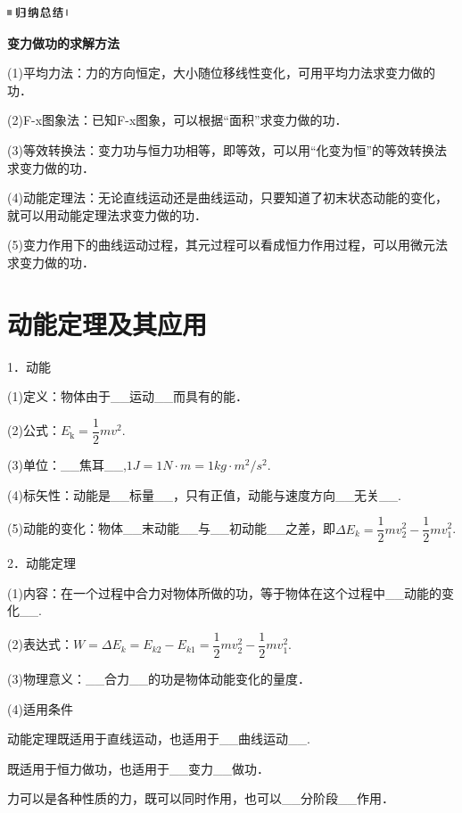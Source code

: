 \documentclass[cn,10.5pt,chinese,mac,chinesefont=founder]{elegantbook}
\begin{document}
\begin{center}\includegraphics[width=0.70833in,height=0.125in]{media/image13.png}

\textbf{变力做功的求解方法}
\end{center}


(1)平均力法：力的方向恒定，大小随位移线性变化，可用平均力法求变力做的功．

(2)F-x图象法：已知F-x图象，可以根据``面积''求变力做的功．

(3)等效转换法：变力功与恒力功相等，即等效，可以用``化变为恒''的等效转换法求变力做的功．

(4)动能定理法：无论直线运动还是曲线运动，只要知道了初末状态动能的变化，就可以用动能定理法求变力做的功．

(5)变力作用下的曲线运动过程，其元过程可以看成恒力作用过程，可以用微元法求变力做的功．

\newpage
\section{动能定理及其应用}


1．动能

(1)定义：物体由于\_\_运动\_\_而具有的能．

(2)公式：$E_{\mathrm{k}}=\dfrac{1}{2} m v^{2}$.

(3)单位：\_\_焦耳\_\_,$1 J=1 N\cdot m=1 kg\cdot m^2/s^2$.

(4)标矢性：动能是\_\_标量\_\_，只有正值，动能与速度方向\_\_无关\_\_.

(5)动能的变化：物体\_\_末动能\_\_与\_\_初动能\_\_之差，即$\Delta E_k=\dfrac{1}{2}mv_2^{2}-\dfrac{1}{2}mv_1^{2}$.

2．动能定理

(1)内容：在一个过程中合力对物体所做的功，等于物体在这个过程中\_\_动能的变化\_\_.

(2)表达式：$W=\Delta E_k=E_{k2}-E_{k1}=\dfrac{1}{2}mv_2^{2}-\dfrac{1}{2}mv_1^{2}$.

(3)物理意义：\_\_合力\_\_的功是物体动能变化的量度．

(4)适用条件

动能定理既适用于直线运动，也适用于\_\_曲线运动\_\_.

既适用于恒力做功，也适用于\_\_变力\_\_做功．

力可以是各种性质的力，既可以同时作用，也可以\_\_分阶段\_\_作用．
\end{document}
